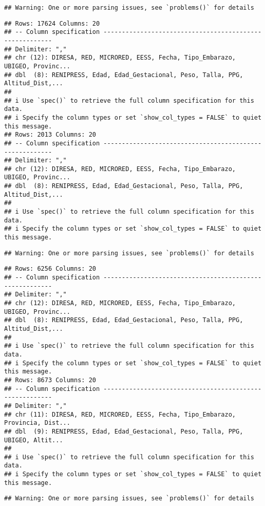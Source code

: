 \documentclass[
]{article}
\begin{document}
\begin{verbatim}
## Warning: One or more parsing issues, see `problems()` for details
\end{verbatim}

\begin{verbatim}
## Rows: 17624 Columns: 20
## -- Column specification --------------------------------------------------------
## Delimiter: ","
## chr (12): DIRESA, RED, MICRORED, EESS, Fecha, Tipo_Embarazo, UBIGEO, Provinc...
## dbl  (8): RENIPRESS, Edad, Edad_Gestacional, Peso, Talla, PPG, Altitud_Dist,...
## 
## i Use `spec()` to retrieve the full column specification for this data.
## i Specify the column types or set `show_col_types = FALSE` to quiet this message.
## Rows: 2013 Columns: 20
## -- Column specification --------------------------------------------------------
## Delimiter: ","
## chr (12): DIRESA, RED, MICRORED, EESS, Fecha, Tipo_Embarazo, UBIGEO, Provinc...
## dbl  (8): RENIPRESS, Edad, Edad_Gestacional, Peso, Talla, PPG, Altitud_Dist,...
## 
## i Use `spec()` to retrieve the full column specification for this data.
## i Specify the column types or set `show_col_types = FALSE` to quiet this message.
\end{verbatim}

\begin{verbatim}
## Warning: One or more parsing issues, see `problems()` for details
\end{verbatim}

\begin{verbatim}
## Rows: 6256 Columns: 20
## -- Column specification --------------------------------------------------------
## Delimiter: ","
## chr (12): DIRESA, RED, MICRORED, EESS, Fecha, Tipo_Embarazo, UBIGEO, Provinc...
## dbl  (8): RENIPRESS, Edad, Edad_Gestacional, Peso, Talla, PPG, Altitud_Dist,...
## 
## i Use `spec()` to retrieve the full column specification for this data.
## i Specify the column types or set `show_col_types = FALSE` to quiet this message.
## Rows: 8673 Columns: 20
## -- Column specification --------------------------------------------------------
## Delimiter: ","
## chr (11): DIRESA, RED, MICRORED, EESS, Fecha, Tipo_Embarazo, Provincia, Dist...
## dbl  (9): RENIPRESS, Edad, Edad_Gestacional, Peso, Talla, PPG, UBIGEO, Altit...
## 
## i Use `spec()` to retrieve the full column specification for this data.
## i Specify the column types or set `show_col_types = FALSE` to quiet this message.
\end{verbatim}

\begin{verbatim}
## Warning: One or more parsing issues, see `problems()` for details
\end{verbatim}
\end{document}
